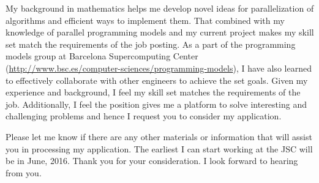 \documentclass[10pt,stdletter,dateno]{newlfm}
\begin{document}
\begin{newlfm}
\par
	   My background in mathematics helps me develop novel ideas for parallelization of algorithms and efficient ways to implement them. 
	   That combined with my knowledge of parallel programming models and my current project makes my skill set match the requirements of the job posting.
	   As a part of the programming models group at Barcelona Supercomputing Center (\url{http://www.bsc.es/computer-sciences/programming-models}), I have also learned to effectively collaborate with other engineers to achieve the set goals. 
	   Given my experience and background, I feel my skill set matches the requirements of the job. 
	   Additionally, I feel the position gives me a platform to solve interesting and challenging problems and hence I request you to consider my application. 
%
\par
Please let me know if there are any other materials or information that will assist you in processing my application. 
The earliest I can start working at the JSC will be in June, 2016. 
Thank you for your consideration. I look forward to hearing from you.
%
%
\end{newlfm}
\end{document}
